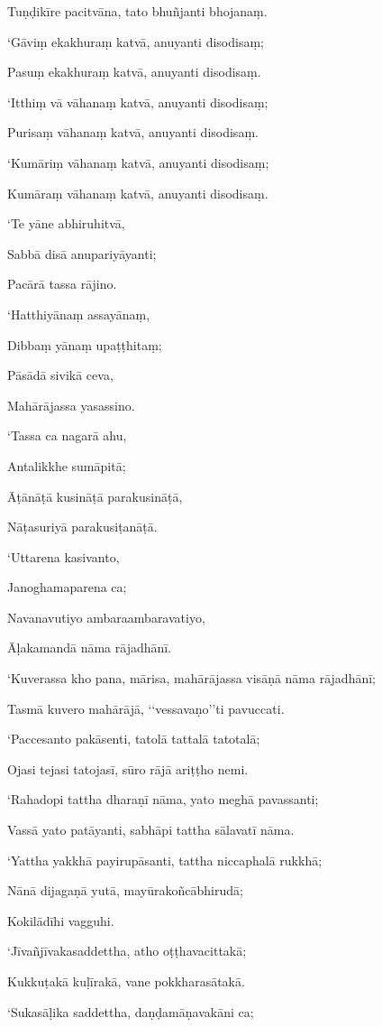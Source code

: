 Tuṇḍikīre pacitvāna, tato bhuñjanti bhojanaṃ.

‘Gāviṃ ekakhuraṃ katvā, anuyanti disodisaṃ;

Pasuṃ ekakhuraṃ katvā, anuyanti disodisaṃ.

‘Itthiṃ vā vāhanaṃ katvā, anuyanti disodisaṃ;

Purisaṃ vāhanaṃ katvā, anuyanti disodisaṃ.

‘Kumāriṃ vāhanaṃ katvā, anuyanti disodisaṃ;

Kumāraṃ vāhanaṃ katvā, anuyanti disodisaṃ.

‘Te yāne abhiruhitvā,

Sabbā disā anupariyāyanti;

Pacārā tassa rājino.

‘Hatthiyānaṃ assayānaṃ,

Dibbaṃ yānaṃ upaṭṭhitaṃ;

Pāsādā sivikā ceva,

Mahārājassa yasassino.

‘Tassa ca nagarā ahu,

Antalikkhe sumāpitā;

Āṭānāṭā kusināṭā parakusināṭā,

Nāṭasuriyā parakusiṭanāṭā.

‘Uttarena kasivanto,

Janoghamaparena ca;

Navanavutiyo ambaraambaravatiyo,

Āḷakamandā nāma rājadhānī.

‘Kuverassa kho pana, mārisa, mahārājassa visāṇā nāma rājadhānī;

Tasmā kuvero mahārājā, ‘‘vessavaṇo’’ti pavuccati.

‘Paccesanto pakāsenti, tatolā tattalā tatotalā;

Ojasi tejasi tatojasī, sūro rājā ariṭṭho nemi.

‘Rahadopi tattha dharaṇī nāma, yato meghā pavassanti;

Vassā yato patāyanti, sabhāpi tattha sālavatī nāma.

‘Yattha yakkhā payirupāsanti, tattha niccaphalā rukkhā;

Nānā dijagaṇā yutā, mayūrakoñcābhirudā;

Kokilādīhi vagguhi.

‘Jīvañjīvakasaddettha, atho oṭṭhavacittakā;

Kukkuṭakā kuḷīrakā, vane pokkharasātakā.

‘Sukasāḷika saddettha, daṇḍamāṇavakāni ca;

